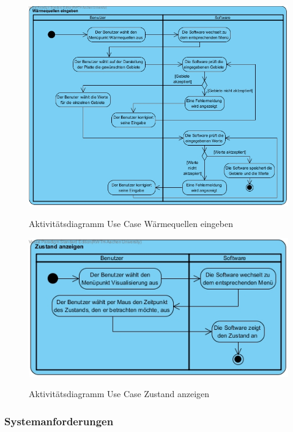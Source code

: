 \begin{figure}[H]
	\centering
	\includegraphics[scale=.5]{Bilder/Waermequellen_eingeben.jpg}\\
	\caption{Aktivitätsdiagramm Use Case Wärmequellen eingeben}
	\label{Aktivitätsdiagramm Use Case Wärmequellen eingeben}
\end{figure}

\begin{figure}[H]
	\centering
	\includegraphics[scale=.5]{Bilder/Zustand_anzeigen.jpg}\\
	\caption{Aktivitätsdiagramm Use Case Zustand anzeigen}
	\label{Aktivitätsdiagramm Use Case Zustand anzeigen}
\end{figure}

\subsubsection{Systemanforderungen}
